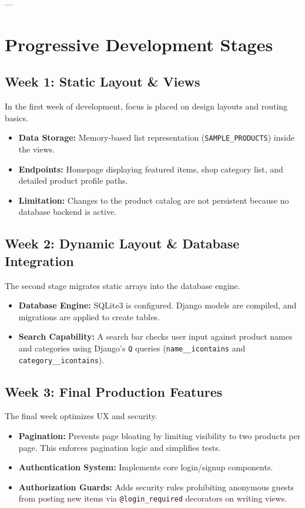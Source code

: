 \documentclass[12pt,a4paper]{report}
\begin{document}
---

\chapter{Progressive Development Stages}

\section{Week 1: Static Layout \& Views}
In the first week of development, focus is placed on design layouts and routing basics.
\begin{itemize}
    \item \textbf{Data Storage:} Memory-based list representation (\texttt{SAMPLE\_PRODUCTS}) inside the views.
    \item \textbf{Endpoints:} Homepage displaying featured items, shop category list, and detailed product profile paths.
    \item \textbf{Limitation:} Changes to the product catalog are not persistent because no database backend is active.
\end{itemize}

\section{Week 2: Dynamic Layout \& Database Integration}
The second stage migrates static arrays into the database engine.
\begin{itemize}
    \item \textbf{Database Engine:} SQLite3 is configured. Django models are compiled, and migrations are applied to create tables.
    \item \textbf{Search Capability:} A search bar checks user input against product names and categories using Django's \texttt{Q} queries (\texttt{name\_\_icontains} and \texttt{category\_\_icontains}).
\end{itemize}

\section{Week 3: Final Production Features}
The final week optimizes UX and security.
\begin{itemize}
    \item \textbf{Pagination:} Prevents page bloating by limiting visibility to two products per page. This enforces pagination logic and simplifies tests.
    \item \textbf{Authentication System:} Implements core login/signup components.
    \item \textbf{Authorization Guards:} Adds security rules prohibiting anonymous guests from posting new items via \texttt{@login\_required} decorators on writing views.
\end{itemize}
\end{document}

